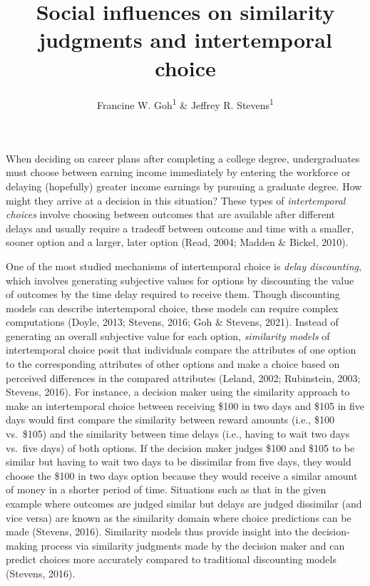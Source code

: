 \documentclass[
  pub,floatsintext]{apa6}
\title{Social influences on similarity judgments and intertemporal choice}
\author{Francine W. Goh\textsuperscript{1} \& Jeffrey R. Stevens\textsuperscript{1}}
\date{}
\affiliation{\vspace{0.5cm}\textsuperscript{1} University of Nebraska-Lincoln}
\begin{document}
\maketitle

When deciding on career plans after completing a college degree, undergraduates must choose between earning income immediately by entering the workforce or delaying (hopefully) greater income earnings by pursuing a graduate degree. How might they arrive at a decision in this situation? These types of \emph{intertemporal choices} involve choosing between outcomes that are available after different delays and usually require a tradeoff between outcome and time with a smaller, sooner option and a larger, later option (Read, 2004; Madden \& Bickel, 2010).

One of the most studied mechanisms of intertemporal choice is \emph{delay discounting}, which involves generating subjective values for options by discounting the value of outcomes by the time delay required to receive them. Though discounting models can describe intertemporal choice, these models can require complex computations (Doyle, 2013; Stevens, 2016; Goh \& Stevens, 2021). Instead of generating an overall subjective value for each option, \emph{similarity models} of intertemporal choice posit that individuals compare the attributes of one option to the corresponding attributes of other options and make a choice based on perceived differences in the compared attributes (Leland, 2002; Rubinstein, 2003; Stevens, 2016). For instance, a decision maker using the similarity approach to make an intertemporal choice between receiving \$100 in two days and \$105 in five days would first compare the similarity between reward amounts (i.e., \$100 vs.~\$105) and the similarity between time delays (i.e., having to wait two days vs.~five days) of both options. If the decision maker judges \$100 and \$105 to be similar but having to wait two days to be dissimilar from five days, they would choose the \$100 in two days option because they would receive a similar amount of money in a shorter period of time. Situations such as that in the given example where outcomes are judged similar but delays are judged dissimilar (and vice versa) are known as the similarity domain where choice predictions can be made (Stevens, 2016). Similarity models thus provide insight into the decision-making process via similarity judgments made by the decision maker and can predict choices more accurately compared to traditional discounting models (Stevens, 2016).
\end{document}
